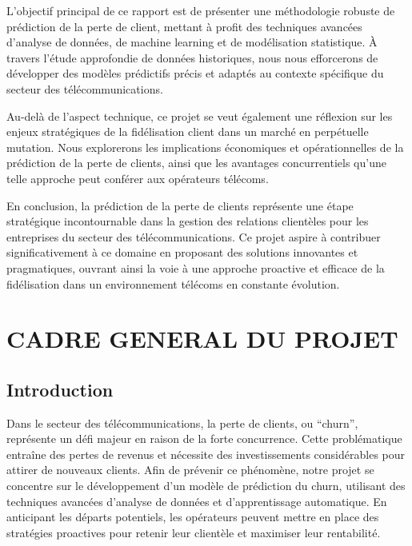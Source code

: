\documentclass[a4paper,12pt]{report}
\begin{document}
L'objectif principal de ce rapport est de présenter une méthodologie robuste de prédiction de la perte de client, mettant à profit des techniques avancées d'analyse de données, de machine learning et de modélisation statistique. À travers l'étude approfondie de données historiques, nous nous efforcerons de développer des modèles prédictifs précis et adaptés au contexte spécifique du secteur des télécommunications.

Au-delà de l'aspect technique, ce projet se veut également une réflexion sur les enjeux stratégiques de la fidélisation client dans un marché en perpétuelle mutation. Nous explorerons les implications économiques et opérationnelles de la prédiction de la perte de clients, ainsi que les avantages concurrentiels qu'une telle approche peut conférer aux opérateurs télécoms.

En conclusion, la prédiction de la perte de clients représente une étape stratégique incontournable dans la gestion des relations clientèles pour les entreprises du secteur des télécommunications. Ce projet aspire à contribuer significativement à ce domaine en proposant des solutions innovantes et pragmatiques, ouvrant ainsi la voie à une approche proactive et efficace de la fidélisation dans un environnement télécoms en constante évolution.

\chapter{CADRE GENERAL DU PROJET}

\section{Introduction}
Dans le secteur des télécommunications, la perte de clients, ou ``churn'', représente un défi majeur en raison de la forte concurrence. Cette problématique entraîne des pertes de revenus et nécessite des investissements considérables pour attirer de nouveaux clients. Afin de prévenir ce phénomène, notre projet se concentre sur le développement d'un modèle de prédiction du churn, utilisant des techniques avancées d'analyse de données et d'apprentissage automatique. En anticipant les départs potentiels, les opérateurs peuvent mettre en place des stratégies proactives pour retenir leur clientèle et maximiser leur rentabilité.
\end{document}
